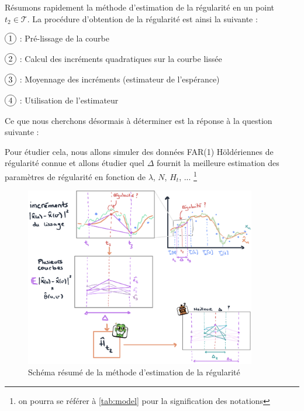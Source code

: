Résumons rapidement la méthode d'estimation de la régularité en un point $t_2 \in \mathcal T$.
\noindent La procédure d'obtention de la régularité est ainsi la suivante :

$\circled 1$ : Pré-lissage de la courbe

$\circled 2$ : Calcul des incréments quadratiques sur la courbe lissée

$\circled 3$ : Moyennage des incréments (estimateur de l'espérance)

$\circled 4$ : Utilisation de l'estimateur

Ce que nous cherchons désormais à déterminer est la réponse à la question suivante :


Pour étudier cela, nous allons simuler des données FAR(1) Höldériennes de régularité connue et allons étudier quel $\Delta$ fournit la meilleure estimation des paramètres de régularité en fonction de $\lambda$, $N$, $H_t$, ... \footnote{on pourra se référer à \ref{tab:model} pour la signification des notations}

\begin{figure}[H]
	\begin{center}
		\includegraphics[width=0.9\textwidth]{Images/sketches/estim_reg.jpg}
	\end{center}

	\caption{Schéma résumé de la méthode d'estimation de la régularité}
	\label{fig:sketch_estim_reg_methodo}
\end{figure}

